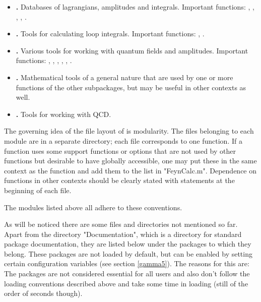 \begin{itemize}

\item{{\bf \fctables.} Databases of lagrangians, amplitudes and integrals. Important functions: , , , , .}

\item{{\bf \fcloops.} Tools for calculating loop integrals. Important functions: , .}

\item{{\bf \fctools.} Various tools for working with quantum fields and amplitudes. Important functions: , , , , , .}

\item{{\bf \general.} Mathematical tools of a general nature that are used by one or more functions of the other subpackages, but may be useful in other contexts as well.}

\item{{\bf \qcd.} Tools for working with QCD.}

\end{itemize}

The governing idea of the file layout of \fc is modularity. The files belonging to each module are in a separate directory; each file corresponds to one function. If a function uses some support functions or options that are not used by other functions but desirable to have globally accessible, one may put these in the same context as the function and add them to the list  in "FeynCalc.m". Dependence on functions in other contexts should be clearly stated with  statements at the beginning of each file.

The modules listed above all adhere to these conventions.

As will be noticed there are some files and directories not mentioned so far. Apart from the directory "Documentation", which is a directory for standard \mma package documentation, they are listed below under the packages to which they belong. These packages are not loaded by default, but can be enabled by setting certain configuration variables (see section \ref{gamma5}). The reasons for this are: The packages are not considered essential for all users and also don't follow the loading conventions described above and take some time in loading (still of the order of seconds though).

